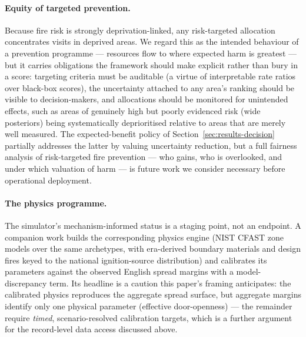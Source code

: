 \paragraph{Equity of targeted prevention.} Because fire risk is strongly
deprivation-linked, any risk-targeted allocation concentrates visits in deprived
areas. We regard this as the intended behaviour of a prevention programme ---
resources flow to where expected harm is greatest --- but it carries obligations
the framework should make explicit rather than bury in a score: targeting
criteria must be auditable (a virtue of interpretable rate ratios over black-box
scores), the uncertainty attached to any area's ranking should be visible to
decision-makers, and allocations should be monitored for unintended effects, such
as areas of genuinely high but poorly evidenced risk (wide posteriors) being
systematically deprioritised relative to areas that are merely well measured.
The expected-benefit policy of Section~\ref{sec:results-decision} partially
addresses the latter by valuing uncertainty reduction, but a full fairness
analysis of risk-targeted fire prevention --- who gains, who is overlooked, and
under which valuation of harm --- is future work we consider necessary before
operational deployment.

\paragraph{The physics programme.} The simulator's mechanism-informed status is a
staging point, not an endpoint. A companion work builds the corresponding physics
engine (NIST CFAST zone models over the same archetypes, with era-derived boundary
materials and design fires keyed to the national ignition-source distribution) and
calibrates its parameters against the observed English spread margins with a
model-discrepancy term. Its headline is a caution this paper's framing anticipates:
the calibrated physics reproduces the aggregate spread surface, but aggregate
margins identify only one physical parameter (effective door-openness) --- the
remainder require \emph{timed}, scenario-resolved calibration targets, which is a
further argument for the record-level data access discussed above.

